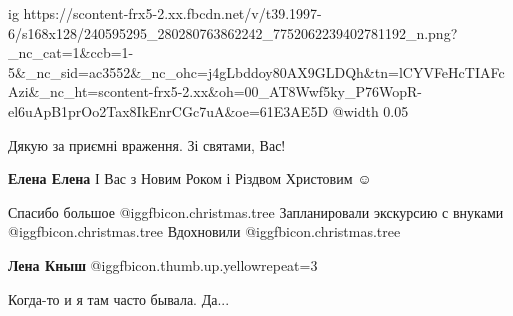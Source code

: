  
 
 
 
 


\ifcmt
  ig https://scontent-frx5-2.xx.fbcdn.net/v/t39.1997-6/s168x128/240595295_280280763862242_7752062239402781192_n.png?_nc_cat=1&ccb=1-5&_nc_sid=ac3552&_nc_ohc=j4gLbddoy80AX9GLDQh&tn=lCYVFeHcTIAFcAzi&_nc_ht=scontent-frx5-2.xx&oh=00_AT8Wwf5ky_P76WopR-el6uApB1prOo2Tax8IkEnrCGc7uA&oe=61E3AE5D
  @width 0.05
\fi

Дякую за приємні враження. Зі святами, Вас!

\textbf{Елена Елена} І Вас з Новим Роком і Різдвом Христовим ☺ ️ 

Спасибо большое  @igg{fbicon.christmas.tree} Запланировали экскурсию с внуками  @igg{fbicon.christmas.tree}  Вдохновили @igg{fbicon.christmas.tree} 

\textbf{Лена Кныш}  @igg{fbicon.thumb.up.yellow}{repeat=3} 

Когда-то и я там часто бывала. Да...
